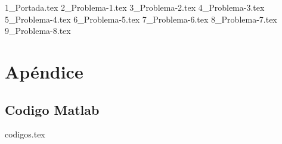 \documentclass[a4paper,12pt,twoside]{all-in-one} %
\begin{document}
{1_Portada.tex}
\FloatBarrier
\newpage
{2_Problema-1.tex}
\FloatBarrier 
\newpage
{3_Problema-2.tex}
\FloatBarrier 
\newpage
{4_Problema-3.tex}
\FloatBarrier 
\newpage
{5_Problema-4.tex}
\FloatBarrier 
\newpage
{6_Problema-5.tex}
\FloatBarrier 
\newpage
{7_Problema-6.tex}
\FloatBarrier 
\newpage
{8_Problema-7.tex}
\FloatBarrier 
\newpage
{9_Problema-8.tex}
\FloatBarrier 
\newpage

\appendix
\section{Apéndice} 
\subsection{Codigo Matlab} 
{codigos.tex}

\pagestyle{\auxsettings}
\printbibliography[heading=bibintoc]
\end{document}
